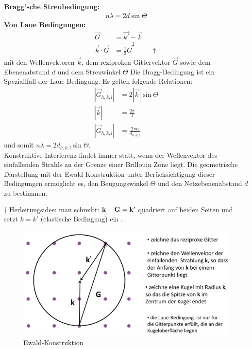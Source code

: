 \textbf{Bragg'sche Streubedingung:}
\begin{align}
    n\lambda = 2 d \sin{\Theta} 
\end{align}
\textbf{Von Laue Bedingungen:}
\begin{align}
\vec{G} &= \vec{k'} - \vec{k} \\
\vec{k} \cdot \vec{G} &= \frac{1}{2} \vec{G}^2 \hspace{1cm}\dagger
\end{align}
mit den Wellenvektoren $\vec{k}$, dem reziproken Gittervektor $\vec{G}$ sowie dem Ebenenabstand $d$ und dem Streuwinkel $\Theta$ Die Bragg-Bedingung ist ein Speziallfall der Laue-Bedingung. Es gelten folgende Relationen:
\begin{align}
    |\vec{G}_{h,k,l}| &= 2 |\vec{k}| \sin{\Theta} \\
    |\vec{k}| &= \frac{2 \pi}{\lambda} \\
    |\vec{G}_{h,k,l}| &= \frac{2 \pi n}{ d_{h,k,l}}
\end{align}
und somit $n \lambda = 2 d_{h,k,l}  \sin{\Theta}$. \\
Konstruktive Interferenz findet immer statt, wenn der Wellenvektor des
einfallenden Strahls an der Grenze einer Brillouin Zone liegt. Die geometrische Darstellung mit der Ewald Konstruktion unter Berücksichtigung dieser Bedingungen ermöglicht es, den Beugungswinkel $\Theta$ und den Netzebenenabstand $d$ zu bestimmen. 

$\dagger$ Herleitungsidee: man schreibt: $\vb{k}-\vb{G} = \vb{k'}$ quadriert auf beiden Seiten und setzt $k=k'$ (elastische Bedingung) ein . 

\begin{figure}[H]
    \centering
    \begin{samepage}
        \includegraphics[width=0.8\linewidth]{resources/09-05-2012/Ewald_Konstruktion.png}
        \caption{Ewald-Konstruktion}
    \end{samepage}
\end{figure}

